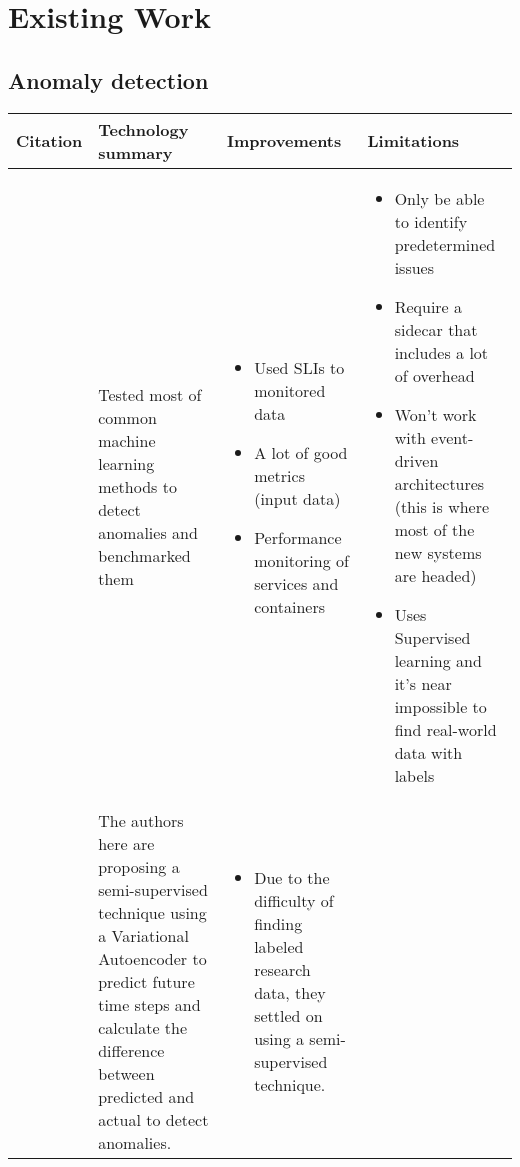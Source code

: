 \section{Existing Work}

\subsection{Anomaly detection}

\begin{longtable}{| p{20mm} | p{43mm} | p{43mm} | p{43mm} |}
\hline
  \textbf{Citation} &
  \textbf{Technology summary} &
  \textbf{Improvements} &
  \textbf{Limitations} \\ \hline
  \cite{du2018anomaly} &
  Tested most of common machine learning methods to detect anomalies and benchmarked them &
  \vspace{-8mm}
  \begin{itemize}[leftmargin=*,noitemsep,nolistsep] 
    \item Used SLIs to monitored data
    \item A lot of good metrics (input data)
    \item Performance monitoring of services and containers
  \vspace{-7mm}
  \end{itemize} &
  \vspace{-8mm}
  \begin{itemize}[leftmargin=*,noitemsep,nolistsep] 
    \item Only be able to identify predetermined issues
    \item Require a sidecar that includes a lot of overhead
    \item Won't work with event-driven architectures (this is where most of the new systems are headed)
    \item Uses Supervised learning and it's near impossible to find real-world data with labels
  \vspace{-7mm}
  \end{itemize} \\ \hline
  \cite{kumarage2018anomaly} &
  The authors here are proposing a semi-supervised technique using a Variational Autoencoder to predict future time steps and calculate the difference between predicted and actual to detect anomalies. &
  \vspace{-8mm}
  \begin{itemize}[leftmargin=*,noitemsep,nolistsep] 
    \item Due to the difficulty of finding labeled research data, they settled on using a semi-supervised technique.

\end{itemize}
\end{longtable}
